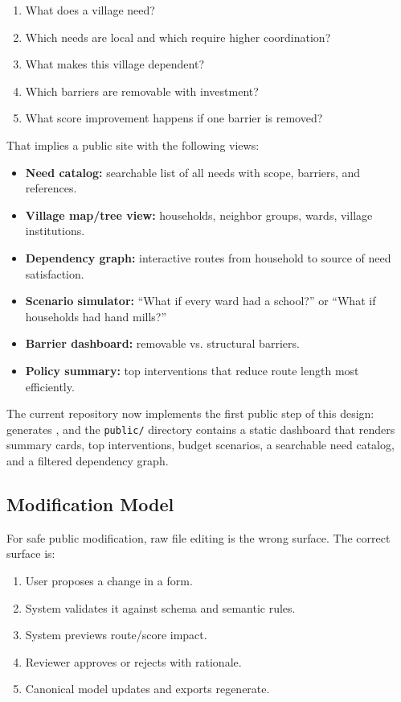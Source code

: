 \documentclass[11pt,a4paper]{article}
\begin{document}
\begin{enumerate}
    \item What does a village need?
    \item Which needs are local and which require higher coordination?
    \item What makes this village dependent?
    \item Which barriers are removable with investment?
    \item What score improvement happens if one barrier is removed?
\end{enumerate}

That implies a public site with the following views:

\begin{itemize}
    \item \textbf{Need catalog:} searchable list of all needs with scope, barriers, and references.
    \item \textbf{Village map/tree view:} households, neighbor groups, wards, village institutions.
    \item \textbf{Dependency graph:} interactive routes from household to source of need satisfaction.
    \item \textbf{Scenario simulator:} ``What if every ward had a school?'' or ``What if households had hand mills?''
    \item \textbf{Barrier dashboard:} removable vs. structural barriers.
    \item \textbf{Policy summary:} top interventions that reduce route length most efficiently.
\end{itemize}

The current repository now implements the first public step of this design:  generates , 
and the \texttt{public/} directory contains a static dashboard that renders summary cards, top interventions, budget scenarios, a searchable need catalog, 
and a filtered dependency graph.

\subsection{Modification Model}

For safe public modification, raw file editing is the wrong surface. The correct surface is:

\begin{enumerate}
    \item User proposes a change in a form.
    \item System validates it against schema and semantic rules.
    \item System previews route/score impact.
    \item Reviewer approves or rejects with rationale.
    \item Canonical model updates and exports regenerate.
\end{enumerate}
\end{document}

